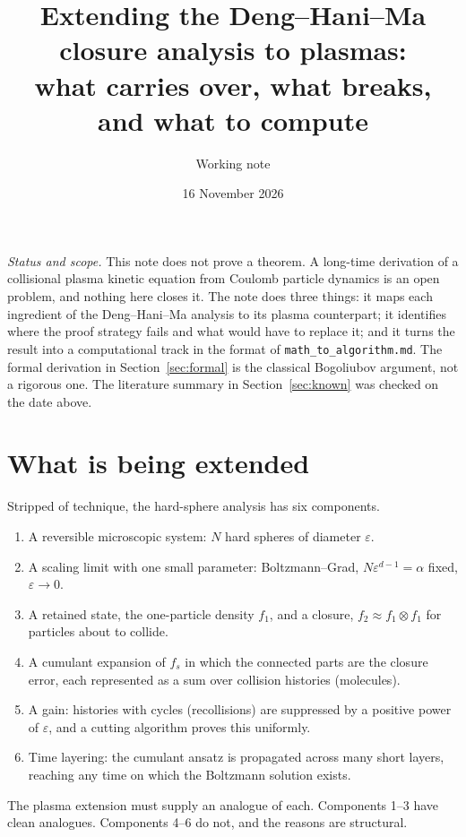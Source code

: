\documentclass[11pt]{article}
\title{Extending the Deng--Hani--Ma closure analysis to plasmas:\\
what carries over, what breaks, and what to compute}
\author{Working note}
\date{16 November 2026}
\newcommand{\eps}{\varepsilon}
\theoremstyle{definition}
\begin{document}
\maketitle

\noindent\emph{Status and scope.} This note does not prove a theorem. A
long-time derivation of a collisional plasma kinetic equation from Coulomb
particle dynamics is an open problem, and nothing here closes it. The note
does three things: it maps each ingredient of the Deng--Hani--Ma analysis to
its plasma counterpart; it identifies where the proof strategy fails and what
would have to replace it; and it turns the result into a computational track
in the format of \texttt{math\_to\_algorithm.md}. The formal derivation in
Section~\ref{sec:formal} is the classical Bogoliubov argument, not a rigorous
one. The literature summary in Section~\ref{sec:known} was checked on the
date above.

\tableofcontents

\section{What is being extended}

Stripped of technique, the hard-sphere analysis has six components.
\begin{enumerate}
  \item A reversible microscopic system: $N$ hard spheres of diameter $\eps$.
  \item A scaling limit with one small parameter: Boltzmann--Grad,
    $N\eps^{d-1} = \alpha$ fixed, $\eps\to 0$.
  \item A retained state, the one-particle density $f_1$, and a closure,
    $f_2 \approx f_1\otimes f_1$ for particles about to collide.
  \item A cumulant expansion of $f_s$ in which the connected parts are the
    closure error, each represented as a sum over collision histories
    (molecules).
  \item A gain: histories with cycles (recollisions) are suppressed by a
    positive power of $\eps$, and a cutting algorithm proves this uniformly.
  \item Time layering: the cumulant ansatz is propagated across many short
    layers, reaching any time on which the Boltzmann solution exists.
\end{enumerate}
The plasma extension must supply an analogue of each. Components 1--3 have
clean analogues. Components 4--6 do not, and the reasons are structural.
\end{document}
